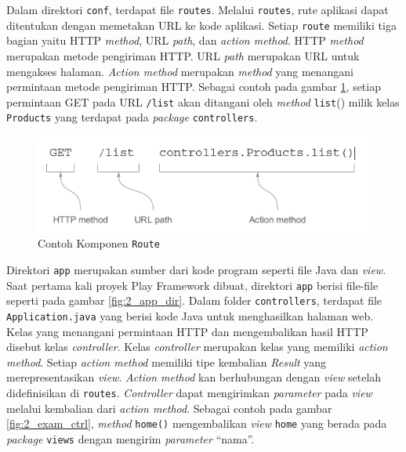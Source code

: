 \documentclass[a4paper,twoside]{article}
\begin{document}
\begin{enumerate}
\begin{enumerate}
Dalam direktori \texttt{conf}, terdapat file \texttt{routes}. Melalui \texttt{routes}, rute aplikasi dapat ditentukan dengan memetakan URL ke kode aplikasi. Setiap \texttt{route} memiliki tiga bagian yaitu HTTP \textit{method}, URL \textit{path}, dan \textit{action method}.  HTTP \textit{method} merupakan metode pengiriman HTTP. URL \textit{path} merupakan URL untuk mengakses halaman. \textit{Action method} merupakan \textit{method} yang menangani permintaan metode pengiriman HTTP. Sebagai contoh pada gambar \ref{fig:2_routes_example}, setiap permintaan GET pada URL \texttt{/list} akan ditangani oleh \textit{method} \texttt{list}() milik kelas \texttt{Products} yang terdapat pada \textit{package} \texttt{controllers}.

\begin{figure}[H]
	\centering
	\includegraphics[scale=0.5]{Gambar/contoh-routes}
	\caption{Contoh Komponen \texttt{Route}\cite{Leroux:2014}} 
	\label{fig:2_routes_example}
\end{figure}

Direktori \texttt{app} merupakan sumber dari kode program seperti file Java dan \textit{view}. Saat pertama kali proyek Play Framework dibuat, direktori \texttt{app} berisi file-file seperti pada gambar \ref{fig:2_app_dir}. Dalam folder \texttt{controllers}, terdapat file \texttt{Application.java} yang berisi kode Java untuk menghasilkan halaman web. Kelas yang menangani permintaan HTTP dan mengembalikan hasil HTTP disebut kelas \textit{controller}. Kelas \textit{controller} merupakan kelas yang memiliki \textit{action method}. Setiap \textit{action method} memiliki tipe kembalian \textit{Result} yang merepresentasikan \textit{view}. \textit{Action method} kan berhubungan dengan \textit{view} setelah didefinisikan di \texttt{routes}. \textit{Controller} dapat mengirimkan \textit{parameter} pada \textit{view} melalui kembalian dari \textit{action method}. Sebagai contoh pada gambar \ref{fig:2_exam_ctrl}, \textit{method} \texttt{home()} mengembalikan \textit{view} \texttt{home} yang berada pada \textit{package} \texttt{views} dengan mengirim \textit{parameter} ``nama''.


\end{enumerate}
\end{enumerate}
\end{document}
